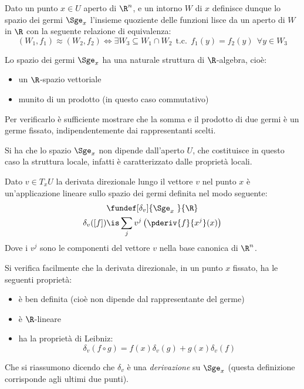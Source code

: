 \begin{defn}
Dato un punto $x\in U$ aperto di $\R ^n$, e un intorno $W$ di $x$ definisce dunque lo spazio dei germi $\Sge_x$ l'insieme quoziente delle funzioni lisce da un aperto di $W$ in $\R$ con la seguente relazione di equivalenza:
\begin{equation*}
(W_1, f_1) \approx (W_2, f_2) \iff \exists W_3 \subseteq W_1 \cap W_2\ \ \text{t.c.}\ \ f_1(y)=f_2(y)\ \ \forall y\in W_3
\end{equation*}
\end{defn}


Lo spazio dei germi $\Sge_x$ ha una  naturale struttura di $\R$-algebra, cioè:
\begin{itemize}
\item un $\R$-spazio vettoriale
\item munito di un prodotto (in questo caso commutativo)
\end{itemize}
Per verificarlo è sufficiente mostrare che la somma e il prodotto di due germi è un germe fissato, indipendentemente dai rappresentanti scelti.

\begin{oss}
Si ha che lo spazio $\Sge_x$ non dipende dall'aperto $U$, che costituisce in questo caso la struttura locale, infatti è caratterizzato dalle proprietà locali.
\end{oss}

\begin{defn}
Dato $v\in T_x U$ la derivata direzionale lungo il vettore $v$ nel punto $x$ è un'applicazione lineare sullo spazio dei germi definita nel modo seguente:
\begin{gather*}
\fundef[\delta_v]{\Sge_x~}{\R} \\
\delta_v([f]) \is \sum_j v^j \left(\pderiv{f}{x^j}(x)\right)
\end{gather*}
Dove i $v^j$ sono le componenti del vettore $v$ nella base canonica di $\R ^n$.
\end{defn}

\begin{oss}
Si verifica facilmente che la derivata direzionale, in un punto $x$ fissato, ha le seguenti proprietà:
\begin{itemize}
\item è ben definita (cioè non dipende dal rappresentante del germe)
\item è $\R$-lineare
\item ha la proprietà di Leibniz:
\begin{equation*}
\delta_v(f\circ g) = f(x)\delta_v(g) + g(x)\delta_v(f)
\end{equation*}
\end{itemize}
Che si riassumono dicendo che $\delta_v$ è una \emph{derivazione} su $\Sge_x$ (questa definizione corrisponde agli ultimi due punti).
\end{oss}

